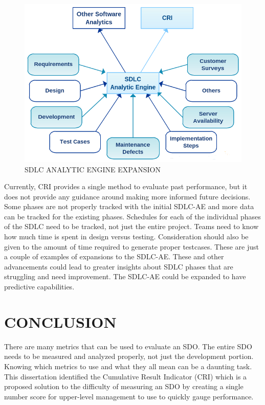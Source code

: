 \documentclass[SDSUThesis.tex]{subfiles}
\begin{document}
    \begin{figure}[ht]
    \includegraphics[scale=.75]{images/sdlcae-adv.png}
    \caption{SDLC ANALYTIC ENGINE EXPANSION}
    \label{fig:sdlc-ae-adv}
    \end{figure}
    
    Currently, CRI provides a single method to evaluate past 
    performance, but it does not
    provide any guidance around making more informed future decisions. 
    Some phases are not properly tracked with the initial SDLC-AE and more
    data can be tracked for the existing phases.
    Schedules for each of the individual phases of the SDLC need to be tracked,
    not just the entire project.  Teams need to know how much time is spent
    in design versus testing.  Consideration should also be given to the amount
    of time required to generate
    proper testcases.  These are just a couple of examples of expansions
    to the SDLC-AE.  These and other advancements could lead to greater
    insights about SDLC phases that are struggling and need improvement.
    The SDLC-AE could be expanded to have predictive capabilities.


\section{CONCLUSION}

    There are many metrics that can be used to evaluate an SDO. 
    The entire SDO needs to be measured 
    and analyzed properly, not just the development portion. 
    Knowing which metrics to use and what they all mean can be a daunting task.  
    This dissertation identified the Cumulative Result Indicator (CRI) which is a
    proposed solution to the difficulty of measuring an SDO by creating a
    single number score for upper-level management to use to quickly gauge
    performance. 
    
\end{document}
